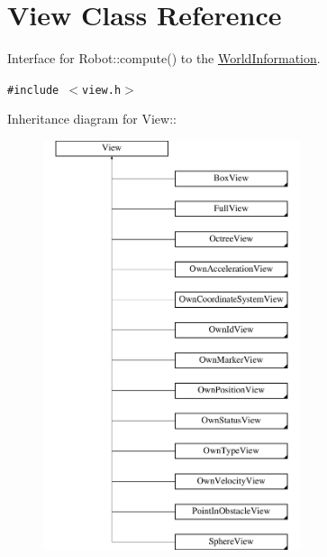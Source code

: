 \hypertarget{class_view}{
\section{View Class Reference}
\label{class_view}
}
Interface for Robot::compute() to the \hyperlink{class_world_information}{WorldInformation}.  


{\tt \#include $<$view.h$>$}

Inheritance diagram for View::\begin{figure}[H]
\begin{center}
\leavevmode
\includegraphics[height=12cm]{class_view}
\end{center}
\end{figure}
